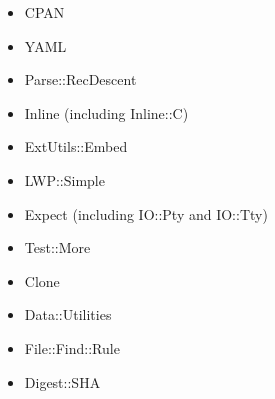 \documentclass[12pt]{article}
\begin{document}
\begin{itemize}
   \item CPAN
   \item YAML
   \item Parse::RecDescent
   \item Inline (including Inline::C)
   \item ExtUtils::Embed
   \item LWP::Simple
   \item Expect (including IO::Pty and IO::Tty)
   \item Test::More
   \item Clone
   \item Data::Utilities
   \item File::Find::Rule
   \item Digest::SHA
\end{itemize}
\end{document}
